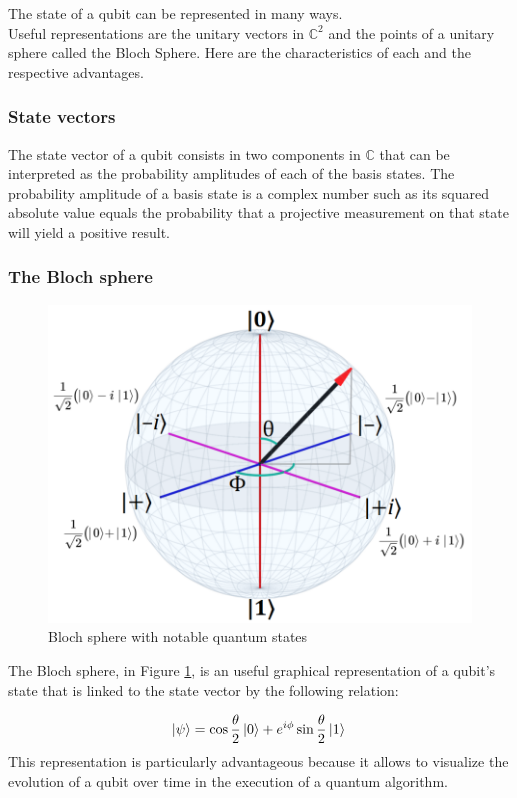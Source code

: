\documentclass{article}
\begin{document}
The state of a qubit can be represented in many ways.\\
Useful representations are the unitary vectors in $\mathbb{C}^2$
and the points of a unitary sphere called the Bloch Sphere.
Here are the characteristics of each and the respective advantages.

\subsubsection{State vectors}

The state vector of a qubit consists in two components in $\mathbb{C}$
that can be interpreted as the probability amplitudes of each of the
basis states.
The probability amplitude of a basis state is a complex number such
as its squared absolute value equals the probability that a
projective measurement on that state will yield a positive result.


\subsubsection{The Bloch sphere}

\begin{figure}
	\centering

	\includegraphics[scale=0.5]{bloch-sphere.png}
	\caption{Bloch sphere with notable quantum states}
	\label{blsphere}
\end{figure}
The Bloch sphere, in Figure \ref{blsphere},
is an useful graphical representation of a qubit's state
that is linked to the state vector by the following relation:

\begin{equation}
	\ket{\psi} = \cos{\dfrac{\theta}{2}}\ket{0}+e^{i\phi}\sin{\dfrac{\theta}{2}}\ket{1} \\
\end{equation}
This representation is particularly advantageous because it allows
to visualize the evolution of a qubit over time in the execution
of a quantum algorithm.
\end{document}
